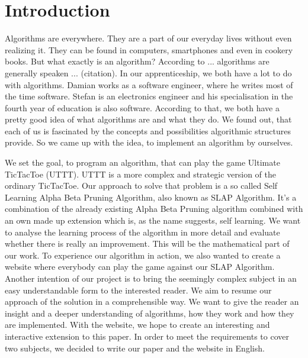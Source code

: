 \section{Introduction}
Algorithms are everywhere. They are a part of our everyday lives without even realizing it. They can be found in computers, smartphones and even in cookery books. But what exactly is an algorithm? According to ... algorithms are generally speaken ... (citation).
In our apprenticeship, we both have a lot to do with algorithms. Damian works as a software engineer, where he writes most of the time software. Stefan is an electronics engineer and his specialisation in the fourth year of education is also software. According to that, we both have a pretty good idea of what algorithms are and what they do. We found out, that each of us is fascinated by the concepts and possibilities algorithmic structures provide. So we came up with the idea, to implement an algorithm by ourselves. 

We set the goal, to program an algorithm, that can play the game Ultimate TicTacToe (UTTT). UTTT is a more complex and strategic version of the ordinary TicTacToe. 
Our approach to solve that problem is a so called Self Learning Alpha Beta Pruning Algorithm, also known as SLAP Algorithm. It's a combination of the already existing Alpha Beta Pruning algorithm combined with an own made up extension which is, as the name suggests, self learning. We want to analyse the learning process of the algorithm in more detail and evaluate whether there is really an improvement. This will be the mathematical part of our work.
To experience our algorithm in action, we also wanted to create a website where everybody can play the game against our SLAP Algorithm.
Another intention of our project is to bring the seemingly complex subject in an easy understandable form to the interested reader. We aim to resume our approach of the solution in a comprehensible way. We want to give the reader an insight and a deeper understanding of algorithms, how they work and how they are implemented. With the website, we hope to create an interesting and interactive extension to this paper.
In order to meet the requirements to cover two subjects, we decided to write our paper and the website in English.


